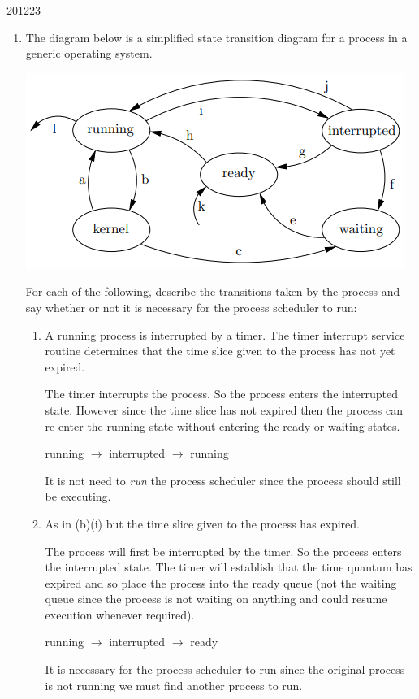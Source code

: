 \documentclass[10pt,\jkfside,a4paper]{article}
\begin{document}
\begin{examquestion}{2012}{2}{3}
\begin{enumerate}
\item The diagram below is a simplified state transition diagram for a process in a
generic operating system.
\begin{center}
\includegraphics{stategeneric}
\end{center}
For each of the following, describe the transitions taken by the process and say
whether or not it is necessary for the process scheduler to run:

\begin{enumerate}

\item A running process is interrupted by a timer. The timer interrupt service
routine determines that the time slice given to the process has not yet
expired.

The timer interrupts the process. So the process enters the interrupted state. 
However since the time slice has not expired then the process can re-enter the 
running state without entering the ready or waiting states.

running $\longrightarrow$ interrupted $\longrightarrow$ running

It is not need to \textit{run} the process scheduler since the process 
should still be executing.

\item As in (b)(i) but the time slice given to the process has expired.

The process will first be interrupted by the timer. So the process enters the 
interrupted state. The timer will establish that the time quantum has expired 
and so place the process into the ready queue (not the waiting queue since the 
process is not waiting on 
anything and could resume execution whenever required).

running $\longrightarrow$ interrupted $\longrightarrow$ ready

It is necessary for the process scheduler to run since the original process 
is not running we must find another process to run. 


\end{enumerate}
\end{enumerate}
\end{examquestion}
\end{document}
